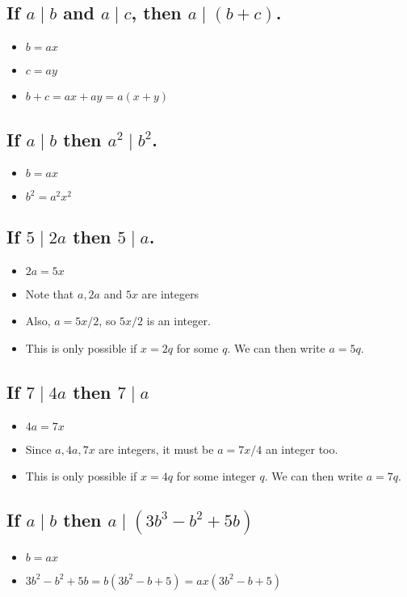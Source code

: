 \documentclass[11pt, oneside]{amsart}
\begin{document}
\subsection{If \(a \mid b\) and \(a \mid c\), then \(a \mid (b+c)\).}
\label{sec:org8406dc1}
\begin{itemize}
\item \(b=ax\)
\item \(c=ay\)
\item \(b+c = ax+ay = a(x+y)\)
\end{itemize}

\subsection{If \(a \mid b\) then \(a^2 \mid b^2\).}
\label{sec:org9e8a217}
\begin{itemize}
\item \(b=ax\)
\item \(b^2 = a^2x^2\)
\end{itemize}

\subsection{If \(5 \mid 2a\) then \(5 \mid a\).}
\label{sec:orgc902dab}
\begin{itemize}
\item \(2a = 5x\)
\item Note that \(a, 2a\) and \(5x\) are integers
\item Also, \(a = 5x/2\), so \(5x/2\) is an integer.
\item This is only possible if \(x=2q\) for some \(q\).  We can then write \(a = 5q\).
\end{itemize}

\subsection{If \(7 \mid 4a\) then \(7 \mid a\)}
\label{sec:org3d5cd08}
\begin{itemize}
\item \(4a = 7x\)
\item Since \(a, 4a, 7x\) are integers, it must be \(a = 7x/4\) an integer too.
\item This is only possible if \(x = 4q\) for some integer \(q\).  We can then write \(a=7q\).
\end{itemize}

\subsection{If \(a \mid b\) then \(a \mid (3b^3-b^2+5b)\)}
\label{sec:org47f2b7c}
\begin{itemize}
\item \(b=ax\)
\item \(3b^2-b^2+5b = b(3b^2-b+5)=ax(3b^2-b+5)\)
\end{itemize}
\end{document}
